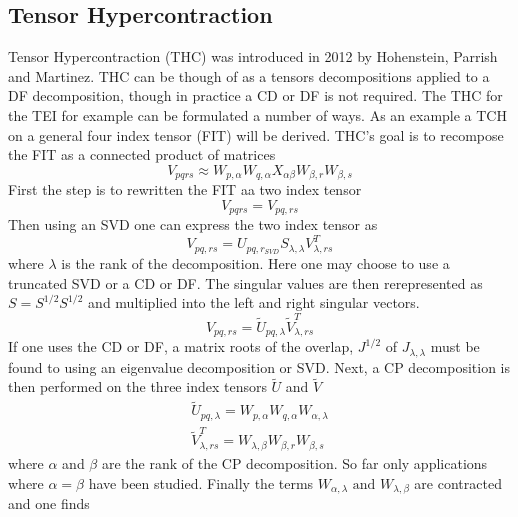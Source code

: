 	\subsection{Tensor Hypercontraction}
		Tensor Hypercontraction (THC) was introduced in 2012 by Hohenstein, Parrish and Martinez\cite{Schutski}.  THC can be though of as a tensors decompositions applied to a DF decomposition, though in practice a CD or DF is not required. The THC for the TEI for example can be formulated a number of ways.  As an example a TCH on a general four index tensor (FIT) will be derived.  THC's goal is to recompose the FIT as a connected product of matrices 
			\begin{equation}
				V_{pqrs} \approx W_{p,\alpha} W_{q,\alpha} X_{\alpha\beta} W_{\beta, r} W_{\beta,s}
			\end{equation}
		First the step is to rewritten the FIT aa two index tensor
			\begin{equation}
				V_{pqrs} = V_{pq,rs}
			\end{equation}
		Then using an SVD one can express the two index tensor as
			\begin{equation}
				V_{pq,rs} = U_{pq,r_{SVD}}S_{\lambda,\lambda} V^T_{\lambda, rs}
			\end{equation}
		where $\lambda$ is the rank of the decomposition.  Here one may choose to use a truncated SVD or a CD or DF.  The singular values are then rerepresented as $S = S^{1/2} S^{1/2}$ and multiplied into the left and right singular vectors.
			\begin{equation}
				V_{pq,rs} = \tilde{U}_{pq, \lambda} \tilde{V}^T_{\lambda,rs}
			\end{equation}
		If one uses the CD or DF, a matrix roots of the overlap, $J^{1/2}$ of $J_{\lambda,\lambda}$ must be found to using an eigenvalue decomposition or SVD. Next, a CP decomposition is then performed on the three index tensors $\tilde{U}$ and $\tilde{V}$
			\begin{equation}
				\begin{aligned}
					\tilde{U}_{pq, \lambda} = W_{p,\alpha} W_{q, \alpha} W_{\alpha, \lambda}\\
					\tilde{V}^T_{\lambda,rs} = W_{\lambda, \beta} W_{\beta, r} W_{\beta, s}
				\end{aligned}
			\end{equation}
		where $\alpha$ and $\beta$ are the rank of the CP decomposition.  So far only applications where $\alpha = \beta$ have been studied. Finally the terms $W_{\alpha, \lambda} \text{ and } W_{\lambda, \beta}$ are contracted and one finds
